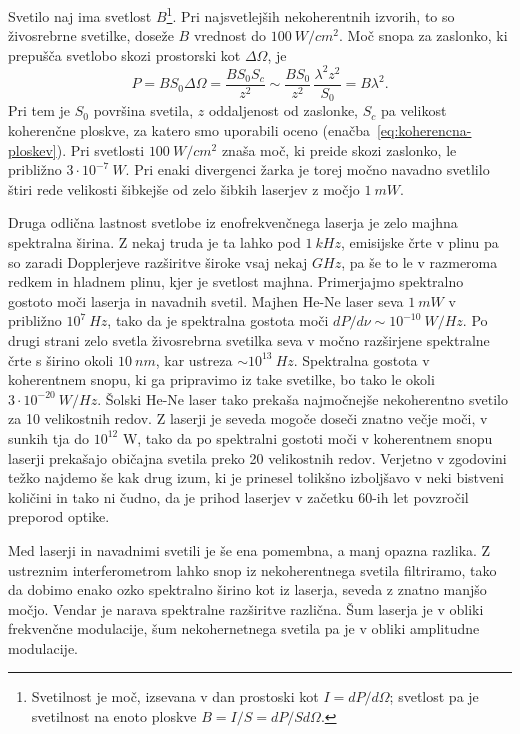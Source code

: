 Svetilo naj ima svetlost $B$\footnote{Svetilnost je moč, izsevana v dan 
prostoski kot $I = dP/d\Omega$; svetlost pa je svetilnost na enoto ploskve
$B=I/S = dP/Sd\Omega$.}. Pri najsvetlejših nekoherentnih izvorih, 
to so živosrebrne svetilke, doseže $B$ vrednost do $100~\si{W/cm^{2}}$. 
Moč snopa za zaslonko, ki prepušča svetlobo skozi prostorski kot $\Delta\Omega$, 
je
\begin{equation}
P=BS_{0}\Delta \Omega =\frac{BS_{0}S_{c}}{z^{2}}\sim \frac{BS_{0}}{z^{2}}\,
\frac{\lambda ^{2}z^{2}}{S_{0}}=B\lambda ^{2}.
\label{5.21}
\end{equation}
Pri tem je $S_{0}$ površina svetila, $z$ oddaljenost od zaslonke, 
$S_{c}$ pa velikost koherenčne ploskve, za katero smo uporabili oceno 
(enačba~\ref{eq:koherencna-ploskev}). Pri svetlosti $100~\si{W/cm^{2}}$ 
znaša moč, ki preide skozi zaslonko, le približno $3\cdot10^{-7}~\si{W}$.
Pri enaki divergenci žarka je torej močno navadno svetlilo štiri rede
velikosti šibkejše od zelo šibkih laserjev z močjo $1~\si{mW}$. 

Druga odlična lastnost svetlobe iz enofrekvenčnega laserja je zelo majhna
spektralna širina. Z nekaj truda je ta lahko pod $1~\si{kHz}$, emisijske 
črte v plinu pa so zaradi Dopplerjeve razširitve široke vsaj nekaj $\si{GHz}$, 
pa še to le v razmeroma redkem in hladnem plinu, kjer je svetlost majhna.
Primerjajmo spektralno gostoto moči laserja in navadnih svetil. Majhen He-Ne
laser seva $1~\si{mW}$ v približno $10^{7}~\si{Hz}$, tako da je spektralna gostota
moči $dP/d\nu \sim 10^{-10}~\si{W/Hz}$. Po drugi strani zelo svetla 
živosrebrna svetilka seva v močno razširjene spektralne črte s širino okoli 
$10~\si{nm}$, kar ustreza $\sim 10^{13}~\si{Hz}$. 
Spektralna gostota v koherentnem snopu, ki ga pripravimo iz
take svetilke, bo tako le okoli $3\cdot 10^{-20}~\si{W/Hz}$. Šolski
He-Ne laser tako prekaša najmočnejše nekoherentno svetilo za 10
velikostnih redov. Z laserji je seveda mogoče doseči znatno večje
moči, v sunkih tja do $10^{12}$ W, tako da po spektralni gostoti moči v
koherentnem snopu laserji prekašajo običajna svetila preko 20
velikostnih redov. Verjetno v zgodovini težko najdemo še kak drug izum, 
ki je prinesel tolikšno izboljšavo v neki bistveni količini in tako ni 
čudno, da je prihod laserjev v začetku 60-ih let povzročil preporod optike.

\begin{remark}
Med laserji in navadnimi svetili je še ena pomembna, a manj opazna
razlika. Z ustreznim interferometrom lahko snop iz nekoherentnega
svetila filtriramo, tako da dobimo enako ozko spektralno širino kot 
iz laserja, seveda z znatno manjšo močjo. Vendar je narava spektralne razširitve
različna. Šum laserja je v obliki frekvenčne modulacije, 
šum nekohernetnega svetila pa je v obliki amplitudne modulacije.
\end{remark}

